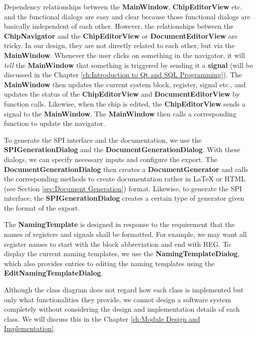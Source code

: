 Dependency relationships between the \textbf{MainWindow}, \textbf{ChipEditorView} etc. and the functional dialogs are easy and clear because those functional dialogs are basically independent of each other. However, the relationships between the \textbf{ChipNavigator} and the \textbf{ChipEditorView} or \textbf{DocumentEditorView} are tricky. In our design, they are not directly related to each other, but via the \textbf{MainWindow}. Whenever the user clicks on something in the navigator, it will \textit{tell} the \textbf{MainWindow} that something is triggered by sending it a \textbf{signal} (will be discussed in the Chapter \ref{ch:Introduction to Qt and SQL Programming}). The \textbf{MainWindow} then updates the current system block, register, signal etc., and updates the status of the \textbf{ChipEditorView} and \textbf{DocumentEditorView} by function calls. Likewise, when the chip is edited, the \textbf{ChipEditorView} sends a signal to the \textbf{MainWindow}. The \textbf{MainWindow} then calls a corresponding function to update the navigator.

To generate the SPI interface and the documentation, we use the \textbf{SPIGenerationDialog} and the \textbf{DocumentGenerationDialog}. With these dialogs, we can specify necessary inputs and configure the export. The \textbf{DocumentGenerationDialog} then creates a \textbf{DocumentGenerator} and calls the corresponding methods to create documentation rather in LaTeX or HTML (see Section \ref{sec:Document Generation}) format. Likewise, to generate the SPI interface, the \textbf{SPIGenerationDialog} creates a certain type of generator given the format of the export.

The \textbf{NamingTemplate} is designed in response to the requirement that the names of registers and signals shall be formatted. For example, we may want all register names to start with the block abbreviation and end with REG. To display the current naming templates, we use the \textbf{NamingTemplateDialog}, which also provides entries to editing the naming templates using the \textbf{EditNamingTemplateDialog}.

Although the class diagram does not regard how each class is implemented but only what functionalities they provide, we cannot design a software system completely without considering the design and implementation details of each class. We will discuss this in the Chapter \ref{ch:Module Design and Implementation}.